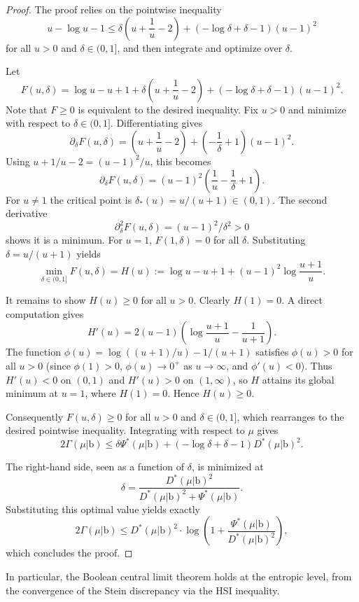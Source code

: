 \documentclass[10pt, reqno]{amsart}
\numberwithin{equation}{section}
\theoremstyle{definition}
\theoremstyle{plain}
\theoremstyle{remark}
\newcommand{\1}{\mathbbm{1}}
\begin{document}
\begin{proof}
The proof relies on the pointwise inequality
\[
u - \log u - 1 \leq \delta\!\left(u+\frac1u-2\right) + (-\log\delta+\delta-1)(u-1)^2
\]
for all $u>0$ and $\delta\in(0,1]$, and then integrate and optimize over $\delta$.

Let
\[
F(u,\delta)
= \log u - u + 1
+ \delta\!\left(u+\frac1u-2\right)
+ (-\log\delta+\delta-1)(u-1)^2.
\]
Note that $F\geq 0$ is equivalent to the desired inequality.
Fix $u>0$ and minimize with respect to $\delta\in(0,1]$. Differentiating gives
\[
\partial_\delta F(u,\delta)
= \left(u+\frac1u-2\right) + \left(-\frac1\delta+1\right)(u-1)^2.
\]
Using $u+1/u-2=(u-1)^2/u$, this becomes
\[
\partial_\delta F(u,\delta)
= (u-1)^2 \left(\frac1u - \frac1\delta +1\right).
\]
For $u\neq 1$ the critical point is $\delta_*(u)=u/(u+1)\in(0,1)$. The second derivative
\[
\partial_\delta^2 F(u,\delta) = (u-1)^2/\delta^2 >0
\]
shows it is a minimum. For $u=1$, $F(1,\delta)=0$ for all $\delta$. Substituting $\delta=u/(u+1)$ yields
\[
\min_{\delta\in(0,1]} F(u,\delta)
= H(u) := \log u - u + 1 + (u-1)^2 \log\!\frac{u+1}{u}.
\]

It remains to show $H(u)\ge 0$ for all $u>0$. Clearly $H(1)=0$. A direct computation gives
\[
H'(u) = 2(u-1)\left( \log\frac{u+1}{u} - \frac1{u+1} \right).
\]
The function $\phi(u)=\log((u+1)/u) - 1/(u+1)$ satisfies $\phi(u)>0$ for all $u>0$ (since $\phi(1)>0$, $\phi(u)\to 0^+$ as $u\to\infty$, and $\phi'(u)<0$). Thus $H'(u)<0$ on $(0,1)$ and $H'(u)>0$ on $(1,\infty)$, so $H$ attains its global minimum at $u=1$, where $H(1)=0$. Hence $H(u)\ge 0$.

Consequently $F(u,\delta)\ge 0$ for all $u>0$ and $\delta\in(0,1]$, which rearranges to the desired pointwise inequality. Integrating with respect to $\mu$ gives
\[
2\Gamma(\mu|\mathbb{\mathrm{b}})
\leq \delta \Psi^*(\mu|\mathbb{\mathrm{b}}) + (-\log\delta + \delta -1) D^*(\mu|\mathbb{\mathrm{b}})^2.
\]

The right-hand side, seen as a function of $\delta$, is minimized at
\[
\delta = \frac{D^*(\mu|\mathbb{\mathrm{b}})^2}{D^*(\mu|\mathbb{\mathrm{b}})^2 + \Psi^*(\mu|\mathbb{\mathrm{b}})}.
\]
Substituting this optimal value yields exactly
\[
2\Gamma(\mu|\mathbb{\mathrm{b}})
\leq D^*(\mu|\mathbb{\mathrm{b}})^2 \cdot \log\left(1+\frac{\Psi^*(\mu|\mathbb{\mathrm{b}})}{D^*(\mu|\mathbb{\mathrm{b}})^2}\right),
\]
which concludes the proof.
\end{proof}
In particular, the Boolean central limit theorem holds at the entropic level, from the convergence of the Stein discrepancy via the HSI inequality.
\end{document}
